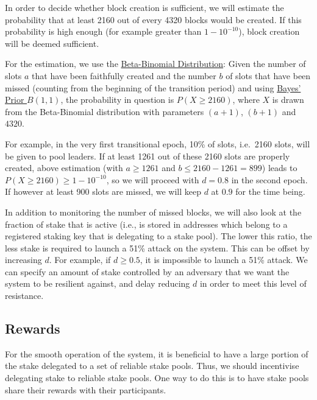 \documentclass[11pt,a4paper]{article}
\begin{document}
In order to decide whether block creation is sufficient, we will
estimate the probability that at least 2160 out of every 4320 blocks
would be created. If this probability is high enough (for example
greater than \(1 - 10^{-10}\)), block creation will be deemed
sufficient.

For the estimation, we use the
\href{https://en.wikipedia.org/wiki/Beta-binomial_distribution}{Beta-Binomial
Distribution}: Given the number of slots \(a\) that have been faithfully
created and the number \(b\) of slots that have been missed (counting
from the beginning of the transition period) and using
\href{https://en.wikipedia.org/wiki/Beta_distribution\#Bayes'_prior_probability_(Beta(1,1))}{Bayes'
Prior \(B(1,1)\)}, the probability in question is \(P(X\geq 2160)\),
where \(X\) is drawn from the Beta-Binomial distribution with parameters
\((a + 1)\), \((b + 1)\) and \(4320\).

For example, in the very first transitional epoch, 10\% of slots,
i.e.~2160 slots, will be given to pool leaders. If at least 1261 out of
these 2160 slots are properly created, above estimation (with
\(a\geq 1261\) and \(b\leq 2160-1261=899\)) leads to
\(P(X\geq 2160)\geq 1-10^{-10}\), so we will proceed with \(d=0.8\) in
the second epoch. If however at least 900 slots are missed, we will keep
\(d\) at \(0.9\) for the time being.

In addition to monitoring the number of missed blocks, we will also look
at the fraction of stake that is active (i.e., is stored in addresses
which belong to a registered staking key that is delegating to a stake
pool). The lower this ratio, the less stake is required to launch a 51\%
attack on the system. This can be offset by increasing \(d\). For
example, if \(d \geq 0.5\), it is impossible to launch a 51\% attack. We
can specify an amount of stake controlled by an adversary that we want
the system to be resilient against, and delay reducing \(d\) in order to
meet this level of resistance.

\subsection{Rewards}
\label{rewards}

For the smooth operation of the system, it is beneficial to have a large
portion of the stake delegated to a set of reliable stake pools. Thus,
we should incentivise delegating stake to reliable stake pools. One way
to do this is to have stake pools share their rewards with their
participants.
\end{document}
